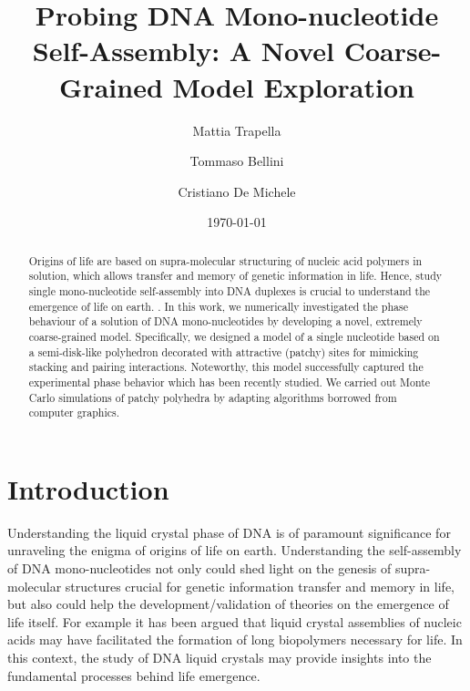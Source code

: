 \documentclass[aip,jcp, amsmath, amssymb, reprint]{revtex4-1}
\begin{document}
\title{Probing DNA Mono-nucleotide Self-Assembly: A Novel Coarse-Grained Model Exploration}
\date{\today}

\author{Mattia Trapella}

\author{Tommaso Bellini}
\author{Cristiano De Michele}

\begin{abstract}
  Origins of life are based on supra-molecular structuring
  of nucleic acid polymers in solution, which allows transfer and memory of genetic information in life. 
  Hence, study single mono-nucleotide self-assembly into DNA duplexes is crucial to understand 
  the emergence of life on earth.
 . %
  In this work, we numerically investigated the phase behaviour of a solution of DNA
  mono-nucleotides by developing a novel, extremely coarse-grained model. Specifically, 
  we designed a model of a single nucleotide based on a semi-disk-like polyhedron decorated with attractive 
  (patchy) sites for mimicking stacking and pairing interactions. Noteworthy, 
  this model successfully captured the experimental phase behavior which has been recently studied.
  We carried out Monte Carlo simulations of patchy polyhedra by adapting algorithms borrowed 
  from computer graphics.%
\end{abstract}

\maketitle


\section{Introduction}
Understanding the liquid crystal phase of DNA is of paramount significance for unraveling the enigma of origins of life
on earth. Understanding the self-assembly of DNA mono-nucleotides not only could shed light on the genesis of 
supra-molecular structures crucial for genetic information transfer and memory in life, but also could help the 
development/validation of theories on the emergence of life itself\cite{Jia}. 
For example it has been argued that  liquid crystal assemblies of nucleic acids may have facilitated the formation 
of long biopolymers necessary for life. In this context, the study of DNA liquid crystals may provide 
insights into the fundamental processes behind life emergence.  \\
\end{document}
